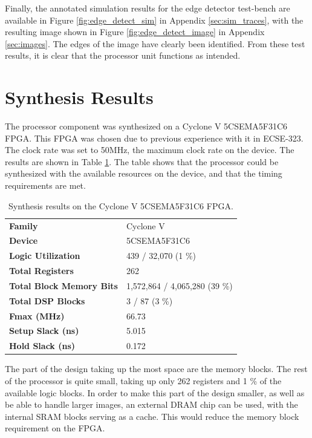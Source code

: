 \documentclass[a4paper, 10pt, titlepage]{article}
\begin{document}
Finally, the annotated simulation results for the edge detector test-bench are available in Figure \ref{fig:edge_detect_sim} in Appendix \ref{sec:sim_traces}, with the resulting image shown in Figure \ref{fig:edge_detect_image} in Appendix \ref{sec:images}. The edges of the image have clearly been identified. From these test results, it is clear that the processor unit functions as intended.

\section{Synthesis Results}

The processor component was synthesized on a Cyclone V 5CSEMA5F31C6 FPGA. This FPGA was chosen due to previous experience with it in ECSE-323. The clock rate was set to 50MHz, the maximum clock rate on the device. The results are shown in Table \ref{tab:synthesis_results}. The table shows that the processor could be synthesized with the available resources on the device, and that the timing requirements are met.

\begin{table}[htb]
    \centering
    \begin{tabular}[c]{ l | l }
        \textbf{Family} & Cyclone V \\
        \textbf{Device} & 5CSEMA5F31C6 \\
        \textbf{Logic Utilization} & 439 / 32,070 (1 \%) \\
        \textbf{Total Registers} & 262 \\
        \textbf{Total Block Memory Bits} & 1,572,864 / 4,065,280 (39 \%) \\
        \textbf{Total DSP Blocks} & 3 / 87 (3 \%) \\
        \textbf{Fmax (MHz)} & 66.73 \\
        \textbf{Setup Slack (ns)} & 5.015 \\
        \textbf{Hold Slack (ns)} & 0.172 \\
    \end{tabular}
    \caption{Synthesis results on the Cyclone V 5CSEMA5F31C6 FPGA.}
    \label{tab:synthesis_results}
\end{table}

The part of the design taking up the most space are the memory blocks. The rest of the processor is quite small, taking up only 262 registers and 1 \% of the available logic blocks. In order to make this part of the design smaller, as well as be able to handle larger images, an external DRAM chip can be used, with the internal SRAM blocks serving as a cache. This would reduce the memory block requirement on the FPGA.
\end{document}
